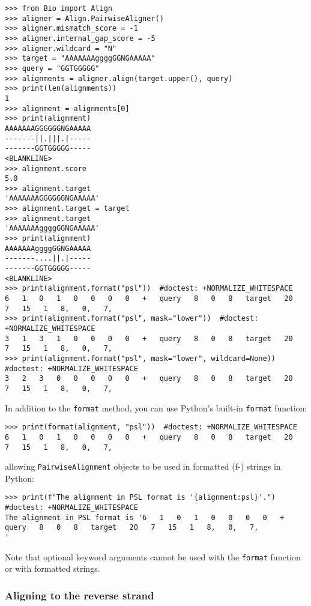 \begin{itemize}
\begin{verbatim}
>>> from Bio import Align
>>> aligner = Align.PairwiseAligner()
>>> aligner.mismatch_score = -1
>>> aligner.internal_gap_score = -5
>>> aligner.wildcard = "N"
>>> target = "AAAAAAAggggGGNGAAAAA"
>>> query = "GGTGGGGG"
>>> alignments = aligner.align(target.upper(), query)
>>> print(len(alignments))
1
>>> alignment = alignments[0]
>>> print(alignment)
AAAAAAAGGGGGGNGAAAAA
-------||.|||.|-----
-------GGTGGGGG-----
<BLANKLINE>
>>> alignment.score
5.0
>>> alignment.target
'AAAAAAAGGGGGGNGAAAAA'
>>> alignment.target = target
>>> alignment.target
'AAAAAAAggggGGNGAAAAA'
>>> print(alignment)
AAAAAAAggggGGNGAAAAA
-------....||.|-----
-------GGTGGGGG-----
<BLANKLINE>
>>> print(alignment.format("psl"))  #doctest: +NORMALIZE_WHITESPACE
6   1   0   1   0   0   0   0   +   query   8   0   8   target   20   7   15   1   8,   0,   7,
>>> print(alignment.format("psl", mask="lower"))  #doctest: +NORMALIZE_WHITESPACE
3   1   3   1   0   0   0   0   +   query   8   0   8   target   20   7   15   1   8,   0,   7,
>>> print(alignment.format("psl", mask="lower", wildcard=None))  #doctest: +NORMALIZE_WHITESPACE
3   2   3   0   0   0   0   0   +   query   8   0   8   target   20   7   15   1   8,   0,   7,
\end{verbatim}
\end{itemize}

In addition to the \verb+format+ method, you can use Python's built-in \verb+format+ function:
\begin{verbatim}
>>> print(format(alignment, "psl"))  #doctest: +NORMALIZE_WHITESPACE
6   1   0   1   0   0   0   0   +   query   8   0   8   target   20   7   15   1   8,   0,   7,
\end{verbatim}
allowing \verb+PairwiseAlignment+ objects to be used in formatted (f-) strings in Python:
\begin{verbatim}
>>> print(f"The alignment in PSL format is '{alignment:psl}'.")  #doctest: +NORMALIZE_WHITESPACE
The alignment in PSL format is '6   1   0   1   0   0   0   0   +   query   8   0   8   target   20   7   15   1   8,   0,   7,
'
\end{verbatim}
Note that optional keyword arguments cannot be used with the \verb+format+ function or with formatted strings.


\subsubsection{Aligning to the reverse strand}
\label{sec:pairwise-general-gapscores}

